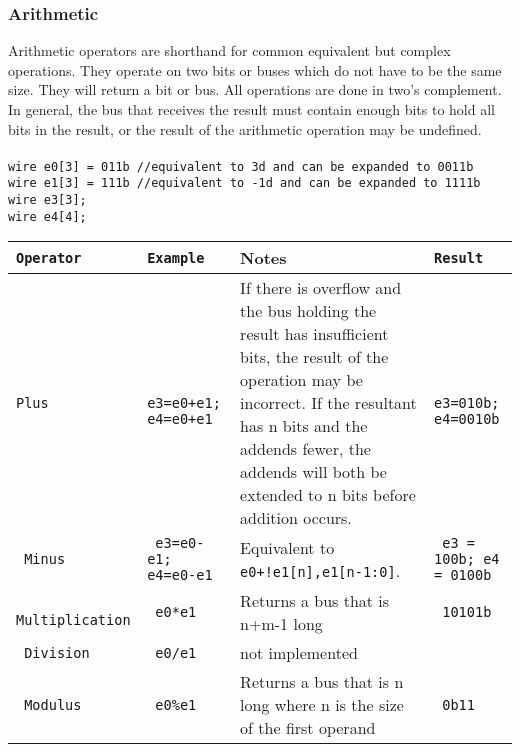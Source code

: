 \documentclass[letterpaper,11pt]{article}
\begin{document}
        \subsubsection{Arithmetic}
        Arithmetic operators are shorthand for common equivalent but complex operations. They operate on two bits or buses which do not have to be the same size. They will return a bit or bus. All operations are done in two’s complement.\\
        In general, the bus that receives the result must contain enough bits to hold all bits in the result, or the result of the arithmetic operation may be undefined.\\\\
        \texttt{wire e0[3] = 011b //equivalent to 3d and can be expanded to 0011b}\\
		\texttt{wire e1[3] = 111b //equivalent to -1d and can be expanded to 1111b}\\
		\texttt{wire e3[3];}\\
		\texttt{wire e4[4];}\\
        
       \begin{center} 
        \begin{tabular}{|>{\texttt\bgroup}l<{\egroup}|>{\texttt\bgroup}l<{\egroup}|p{2in}|>{\texttt\bgroup}l<{\egroup}|}
        \hline
        Operator&Example&Notes&Result\\ \hline
        Plus          	&	e3=e0+e1; e4=e0+e1	&	If there is overflow and the bus holding the result has insufficient bits, the result of the operation may be incorrect. If the resultant has n bits and the addends fewer, the addends will both be extended to n bits before addition occurs.     	&	e3=010b; e4=0010b \\ \hline
        Minus         	&	e3=e0-e1; e4=e0-e1	&	Equivalent to \texttt{e0+{!e1[n],e1[n-1:0]}}.                           &	e3 = 100b; e4 = 0100b \\ \hline
        Multiplication	&	e0*e1              &	Returns a bus that is n+m-1 long                                        &	10101b                \\ \hline
        Division      	&	e0/e1               &	not implemented                                                         & 	                      \\ \hline
        Modulus       	&	e0\%e1             	&	Returns a bus that is n long where n is the size of the first operand   &	0b11                  \\ \hline
\end{tabular}
\end{center}
        
\end{document}
